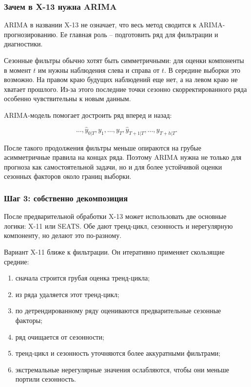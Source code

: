 \documentclass[12pt,fleqn]{article}
\begin{document}
\subsubsection{Зачем в X-13 нужна ARIMA}

ARIMA в названии X-13 не означает, что весь метод сводится к ARIMA-прогнозированию.
Ее главная роль -- подготовить ряд для фильтрации и диагностики.

Сезонные фильтры обычно хотят быть симметричными: для оценки компоненты в момент \(t\) им нужны наблюдения слева и справа от \(t\).
В середине выборки это возможно.
На правом краю будущих наблюдений еще нет, а на левом краю не хватает прошлого.
Из-за этого последние точки сезонно скорректированного ряда особенно чувствительны к новым данным.

ARIMA-модель помогает достроить ряд вперед и назад:

\[
\ldots,
\hat y_{0|T},
y_1,\ldots,y_T,
\hat y_{T+1|T},
\ldots,
\hat y_{T+h|T}.
\]

После такого продолжения фильтры меньше опираются на грубые асимметричные правила на концах ряда.
Поэтому ARIMA нужна не только для прогноза как самостоятельной задачи, но и для более устойчивой оценки сезонных факторов около границ выборки.

\subsubsection{Шаг 3: собственно декомпозиция}

После предварительной обработки X-13 может использовать две основные логики: X-11 или SEATS.
Обе дают тренд-цикл, сезонность и нерегулярную компоненту, но делают это по-разному.

Вариант X-11 ближе к фильтрации.
Он итеративно применяет скользящие средние:

\begin{enumerate}
  \item сначала строится грубая оценка тренд-цикла;
  \item из ряда удаляется этот тренд-цикл;
  \item по детрендированному ряду оцениваются предварительные сезонные факторы;
  \item ряд очищается от сезонности;
  \item тренд-цикл и сезонность уточняются более аккуратными фильтрами;
  \item экстремальные нерегулярные значения ослабляются, чтобы они меньше портили сезонность.
\end{enumerate}
\end{document}
